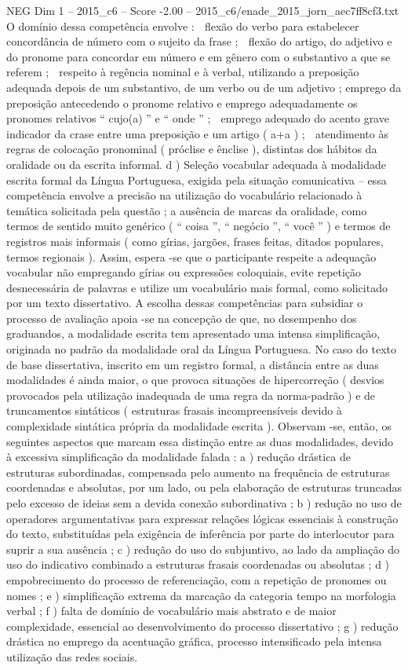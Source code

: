 \begin{textsample}{NEG Dim 1 – 2015\_c6 – Score -2.00 – 2015\_c6/enade\_2015\_jorn\_aec7ff8cf3.txt}
O domínio dessa competência envolve :  flexão do verbo para estabelecer concordância de número com o sujeito da frase ;  flexão do artigo, do adjetivo e do pronome para concordar em número e em gênero com o substantivo a que se referem ;  respeito à regência nominal e à verbal, utilizando a preposição adequada depois de um substantivo, de um verbo ou de um adjetivo ; emprego da preposição antecedendo o pronome relativo e emprego adequadamente os pronomes relativos “ cujo(a) ” e “ onde ” ;  emprego adequado do acento grave indicador da crase entre uma preposição e um artigo ( a+a ) ;  atendimento às regras de colocação pronominal ( próclise e ênclise ), distintas dos hábitos da oralidade ou da escrita informal. d ) Seleção vocabular adequada à modalidade escrita formal da Língua Portuguesa, exigida pela situação comunicativa – essa competência envolve a precisão na utilização do vocabulário relacionado à temática solicitada pela questão ; a ausência de marcas da oralidade, como termos de sentido muito genérico ( “ coisa ”, “ negócio ”, “ você ” ) e termos de registros mais informais ( como gírias, jargões, frases feitas, ditados populares, termos regionais ).
Assim, espera -se que o participante respeite a adequação vocabular não empregando gírias ou expressões coloquiais, evite repetição desnecessária de palavras e utilize um vocabulário mais formal, como solicitado por um texto dissertativo.
A escolha dessas competências para subsidiar o processo de avaliação apoia -se na concepção de que, no desempenho dos graduandos, a modalidade escrita tem apresentado uma intensa simplificação, originada no padrão da modalidade oral da Língua Portuguesa.
No caso do texto de base dissertativa, inscrito em um registro formal, a distância entre as duas modalidades é ainda maior, o que provoca situações de hipercorreção ( desvios provocados pela utilização inadequada de uma regra da norma-padrão ) e de truncamentos sintáticos ( estruturas frasais incompreensíveis devido à complexidade sintática própria da modalidade escrita ).
Observam -se, então, os seguintes aspectos que marcam essa distinção entre as duas modalidades, devido à excessiva simplificação da modalidade falada : a ) redução drástica de estruturas subordinadas, compensada pelo aumento na frequência de estruturas coordenadas e absolutas, por um lado, ou pela elaboração de estruturas truncadas pelo excesso de ideias sem a devida conexão subordinativa ; b ) redução no uso de operadores argumentativas para expressar relações lógicas essenciais à construção do texto, substituídas pela exigência de inferência por parte do interlocutor para suprir a sua ausência ; c ) redução do uso do subjuntivo, ao lado da ampliação do uso do indicativo combinado a estruturas frasais coordenadas ou absolutas ; d ) empobrecimento do processo de referenciação, com a repetição de pronomes ou nomes ; e ) simplificação extrema da marcação da categoria tempo na morfologia verbal ; f ) falta de domínio de vocabulário mais abstrato e de maior complexidade, essencial ao desenvolvimento do processo dissertativo ; g ) redução drástica no emprego da acentuação gráfica, processo intensificado pela intensa utilização das redes sociais.

\end{textsample}
